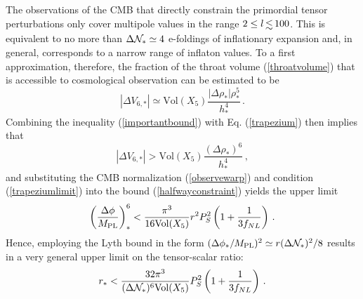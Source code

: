 The observations of the CMB 
that directly constrain the primordial tensor perturbations only 
cover multipole values in the range $2 \le l \, \lsim \, 100$. 
This is equivalent to no more than ${\Delta {\cal{N}}_{*}} \simeq {4}$ 
e-foldings of inflationary expansion and, in general,   
corresponds to a narrow range of inflaton values. 
To a first approximation, therefore, the fraction of the throat volume 
(\ref{throatvolume}) that is accessible to cosmological 
observation can be estimated to be 
\begin{equation}
\label{trapezium}
| \Delta V_{6,*} | \simeq \mathrm{Vol}(X_5) 
\frac{|\Delta \rho_*| \rho^5_{*}}{h^{4}_{*}} \,.
\end{equation}
Combining the inequality (\ref{importantbound}) with Eq. (\ref{trapezium}) 
then implies that 
\begin{equation}
\label{trapeziumlimit}
|\Delta V _{6,*}| > \mathrm{Vol}(X_5) 
\frac{(\Delta \rho_* )^6}{h^{4}_*}  \,,
\end{equation}
and substituting the CMB normalization (\ref{observewarp}) and 
condition (\ref{trapeziumlimit}) into the bound (\ref{halfwayconstraint}) 
yields the upper limit   
\begin{equation}
\label{boundpower6}
\left( \frac{\Delta \phi}{M_{\mathrm{PL}}} \right)^6_{*} 
< \frac{\pi^3}{16\mathrm{Vol}(X_5)} r^2 P_S^2 
\left( 1+ \frac{1}{3f_{NL}} \right)  \,.
\end{equation}
Hence, employing the Lyth bound in the form $(\Delta \phi_* / M_{\mathrm{PL}} )^2 \simeq 
r (\Delta {\cal{N}}_*)^2 /8$  
results in a very general upper limit on the tensor-scalar ratio: 
\begin{equation}
\label{generalbound}
r_{*} < \frac{32 \pi^3}{(\Delta {\cal{N}}_*)^6 \mathrm{Vol}(X_5)} 
P_S^2 \left( 1+ \frac{1}{3f_{NL}} \right) \,.
\end{equation}

